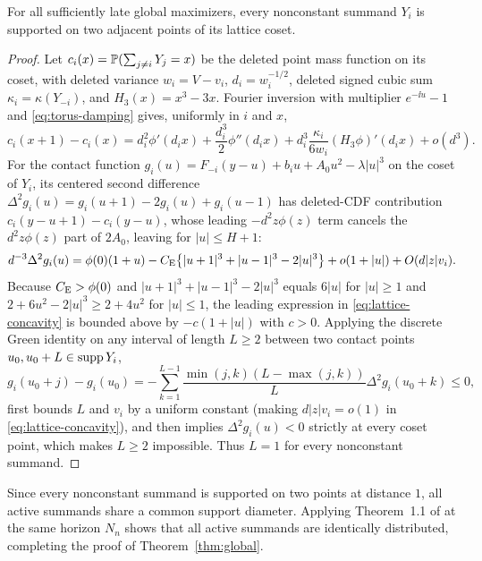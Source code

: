 \begin{lemma}\label{lem:adjacent}
For all sufficiently late global maximizers, every nonconstant summand $Y_i$
is supported on two adjacent points of its lattice coset.
\end{lemma}
\begin{proof}
Let $c_i(x)=\mathbb P(\sum_{j\ne i}Y_j=x)$ be the deleted point mass function on
its coset, with deleted variance $w_i=V-v_i$, $d_i=w_i^{-1/2}$, deleted
signed cubic sum $\kappa_i=\kappa(Y_{-i})$, and $H_3(x)=x^3-3x$. Fourier
inversion with multiplier $e^{-\ii u}-1$ and \eqref{eq:torus-damping} gives,
uniformly in $i$ and $x$,
\begin{equation}\label{eq:pmf-first-difference}
 c_i(x+1)-c_i(x)=d_i^2\phi'(d_ix)+\frac{d_i^3}2\phi''(d_ix)
       +d_i^3\frac{\kappa_i}{6w_i}(H_3\phi)'(d_ix)+o(d^3).
\end{equation}
For the contact function $g_i(u)=F_{-i}(y-u)+b_iu+A_0u^2-\lambda|u|^3$ on the
coset of $Y_i$, its centered second difference
$\Delta^2g_i(u)=g_i(u+1)-2g_i(u)+g_i(u-1)$ has deleted-CDF contribution
$c_i(y-u+1)-c_i(y-u)$, whose leading $-d^2z\phi(z)$ term cancels the
$d^2z\phi(z)$ part of $2A_0$, leaving for $|u|\le H+1$:
\begin{equation}\label{eq:lattice-concavity}
 d^{-3}\Delta^2g_i(u)=\phi(0)(1+u)-C_{\mathrm E}
       \bigl\{|u+1|^3+|u-1|^3-2|u|^3\bigr\}
       +o(1+|u|)+O(d|z|v_i).
\end{equation}
Because $C_{\mathrm E}>\phi(0)$ and $|u+1|^3+|u-1|^3-2|u|^3$ equals $6|u|$ for $|u|\ge1$
and $2+6u^2-2|u|^3\ge2+4u^2$ for $|u|\le1$, the leading expression in
\eqref{eq:lattice-concavity} is bounded above by $-c(1+|u|)$ with $c>0$.
Applying the discrete Green identity on any interval of length $L\ge2$
between two contact points $u_0,u_0+L\in\operatorname{supp} Y_i$,
\[
 g_i(u_0+j)-g_i(u_0)
 =-\sum_{k=1}^{L-1}\frac{\min(j,k)(L-\max(j,k))}{L}\Delta^2g_i(u_0+k)\le0,
\]
first bounds $L$ and $v_i$ by a uniform constant (making $d|z|v_i=o(1)$ in
\eqref{eq:lattice-concavity}), and then implies $\Delta^2g_i(u)<0$ strictly
at every coset point, which makes $L\ge2$ impossible. Thus $L=1$ for every
nonconstant summand.
\end{proof}

Since every nonconstant summand is supported on two points at distance $1$,
all active summands share a common support diameter. Applying Theorem~1.1 of
\citet{BellBernoulli2026} at the same horizon $N_n$ shows that all active
summands are identically distributed, completing the proof of
Theorem~\ref{thm:global}.
